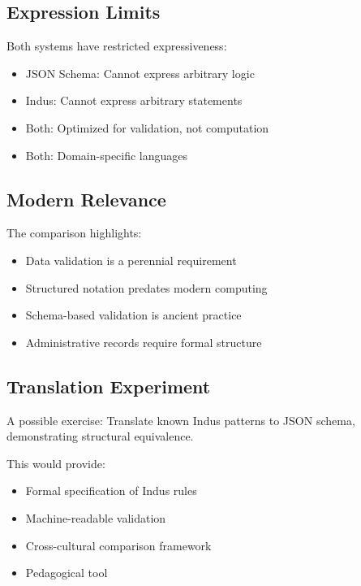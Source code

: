 \subsection{Expression Limits}

Both systems have restricted expressiveness:
\begin{itemize}
    \item JSON Schema: Cannot express arbitrary logic
    \item Indus: Cannot express arbitrary statements
    \item Both: Optimized for validation, not computation
    \item Both: Domain-specific languages
\end{itemize}

\subsection{Modern Relevance}

The comparison highlights:
\begin{itemize}
    \item Data validation is a perennial requirement
    \item Structured notation predates modern computing
    \item Schema-based validation is ancient practice
    \item Administrative records require formal structure
\end{itemize}

\subsection{Translation Experiment}

A possible exercise: Translate known Indus patterns to JSON schema, demonstrating structural equivalence.

This would provide:
\begin{itemize}
    \item Formal specification of Indus rules
    \item Machine-readable validation
    \item Cross-cultural comparison framework
    \item Pedagogical tool
\end{itemize}
